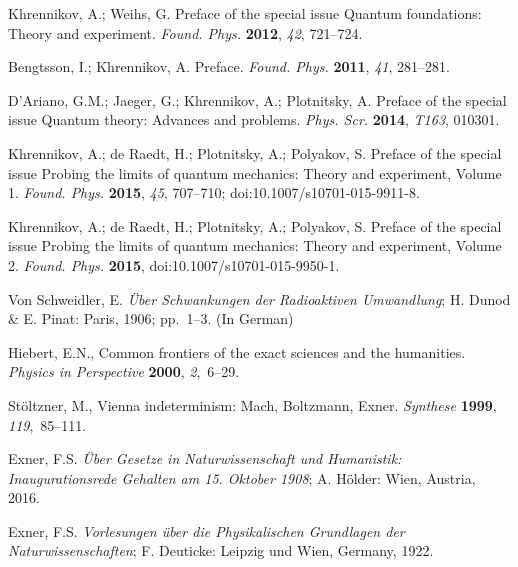 \documentclass[entropy,editorial,accept,moreauthors,pdftex,10pt,a4paper]{Definitions/mdpi}
\begin{document}
\begin{thebibliography}{999}

 Khrennikov, A.;  Weihs,  G. Preface of the special issue Quantum foundations: Theory and experiment.
{\it Found.  Phys.} {\bf 2012}, {\it   42},  721--724.

 Bengtsson, I.; Khrennikov, A. Preface. {\it Found. Phys.}  {\bf 2011},  {\it  41},  281--281.

 D'Ariano, G.M.;   Jaeger, G.;  Khrennikov, A.;  Plotnitsky, A.  Preface of the special
  issue Quantum theory: Advances and problems.  {\it Phys. Scr.} {\bf 2014}, {\it  T163}, 010301.

 Khrennikov, A.;  de Raedt, H.; Plotnitsky, A.;  Polyakov,  S. Preface of the special issue
  Probing the limits of quantum mechanics: Theory and experiment, Volume 1.   {\it Found. Phys.} {\bf 2015},
   {\it 45}, 707--710; doi:10.1007/s10701-015-9911-8.

 Khrennikov, A.;  de Raedt, H.; Plotnitsky, A.;  Polyakov,  S. Preface of the special issue
  Probing the limits of quantum mechanics: Theory and experiment, Volume 2.  {\it Found. Phys.}  {\bf 2015},
  doi:10.1007/s10701-015-9950-1.

Von Schweidler, E. {\em {\"U}ber {S}chwankungen der Radioaktiven {U}mwandlung};
H. Dunod \& E. Pinat: Paris, 1906; pp.~1--3. (In German)

Hiebert, E.N., Common frontiers of the exact sciences and the humanities.
{\it Physics in Perspective} {\bf 2000}, {\em 2},~6--29.

St{\"o}ltzner, M., {V}ienna indeterminism: {M}ach, {B}oltzmann, {E}xner.
 {\it Synthese} {\bf 1999}, {\em 119},~85--111.

Exner, F.S. {\em {\"U}ber {G}esetze in {N}aturwissenschaft und {H}umanistik:
  {I}naugurationsrede Gehalten am 15. {O}ktober 1908};
 A. H\"older: Wien, Austria, 2016.

Exner, F.S. {\em {V}orlesungen \"uber die Physikalischen {G}rundlagen der
  {N}aturwissenschaften}; F. Deuticke: Leipzig und Wien, Germany, 1922.


\end{thebibliography}
\end{document}
